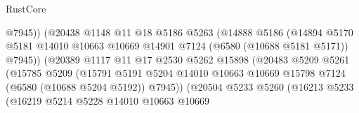 \begin{lexlean}{RustCore}
\begin{coremodule}
                                        @7945))
                                    (@20438
                                      @1148
                                      @11
                                      @18
                                      @5186
                                      @5263
                                      (@14888
                                        @5186
                                        (@14894
                                          @5170
                                          @5181
                                          @14010
                                          @10663
                                          @10669
                                          @14901
                                          @7124
                                          (@6580 (@10688 @5181 @5171))
                                          @7945))
                                      (@20389
                                        @1117
                                        @11
                                        @17
                                        @2530
                                        @5262
                                        @15898
                                        (@20483
                                          @5209
                                          @5261
                                          (@15785
                                            @5209
                                            (@15791
                                              @5191
                                              @5204
                                              @14010
                                              @10663
                                              @10669
                                              @15798
                                              @7124
                                              (@6580 (@10688 @5204 @5192))
                                              @7945))
                                          (@20504
                                            @5233
                                            @5260
                                            (@16213
                                              @5233
                                              (@16219
                                                @5214
                                                @5228
                                                @14010
                                                @10663
                                                @10669

\end{coremodule}
\end{lexlean}
